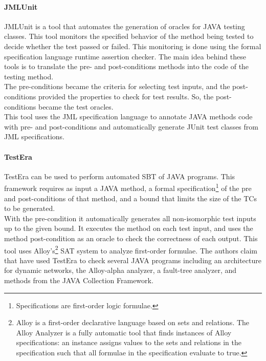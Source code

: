 \paragraph{JMLUnit}
JMLUnit\cite{Cheon04thejml} is a tool that automates the generation of oracles for JAVA testing classes. This tool
monitors the specified behavior of the method being tested to decide whether the test passed or failed.
This monitoring is done using the formal specification language runtime assertion checker.
The main idea behind these tools is to translate the pre- and post-conditions methods into the code of the testing method.\\
The pre-conditions became the criteria for selecting test inputs, and the post-conditions provided the properties to check for
test results. So, the post-conditions became the test oracles.\\
This tool uses the \ac{JML}\cite{Burdy03anoverview} specification language to annotate JAVA methods code with pre- and post-conditions and
automatically generate JUnit test classes from \ac{JML} specifications.

\paragraph{TestEra}
TestEra\cite{testera} can be used to perform automated \ac{SBT} of
JAVA programs. This framework requires as input a JAVA method, a formal specification\footnote{Specifications are first-order logic formulae.}
of the pre and post-conditions of that method, and a bound that limits the size of the \ac{TC}s to be generated.\\
With the pre-condition it automatically generates all non-isomorphic test inputs up to the given bound.
It executes the method on each test input, and uses the method post-condition as an oracle to check the correctness of each output. This tool
uses Alloy's\footnote{Alloy is a first-order declarative language based on sets and relations. The Alloy Analyzer is a fully
automatic tool that finds instances of Alloy specifications: an instance
assigns values to the sets and relations in the specification such that
all formulae in the specification evaluate to true.} \ac{SAT} system to analyze first-order  formulae.
The authors claim that have used TestEra to check several JAVA programs including an architecture for
dynamic networks, the Alloy-alpha analyzer, a fault-tree analyzer, and methods from the JAVA Collection Framework.

